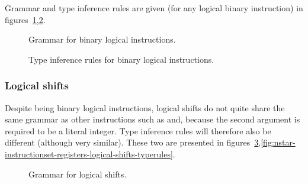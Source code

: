Grammar and type inference rules are given (for any logical binary instruction) in figures~\ref{fig:nstar-instructionset-registers-logical-binary-grammar},\ref{fig:nstar-instructionset-registers-logical-binary-typerules}.

\begin{figure}[H]
	\centering


	\caption{Grammar for binary logical instructions.}
	\label{fig:nstar-instructionset-registers-logical-binary-grammar}
\end{figure}

\begin{figure}[H]
	\centering


	\caption{Type inference rules for binary logical instructions.}
	\label{fig:nstar-instructionset-registers-logical-binary-typerules}
\end{figure}


\subsubsection{Logical shifts}\label{subsubsec:nstar-instructionset-registers-logical-shifts}

Despite being binary logical instructions, logical shifts do not quite share the same grammar as other instructions such as {\Iformat and}, because the second argument is required to be a literal integer.
Type inference rules will therefore also be different (although very similar).
These two are presented in figures~\ref{fig:nstar-instructionset-registers-logical-shifts-grammar},\ref{fig:nstar-instructionset-registers-logical-shifts-typerules}.

\begin{figure}[H]
	\centering


	\caption{Grammar for logical shifts.}
	\label{fig:nstar-instructionset-registers-logical-shifts-grammar}
\end{figure}

